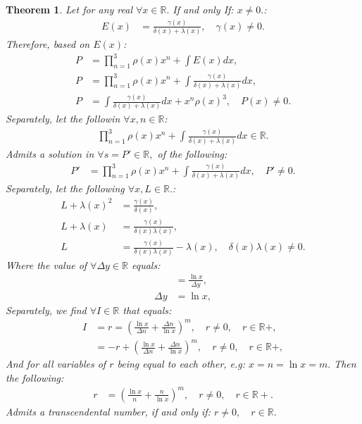 \documentclass[10pt]{article}
\theoremstyle{plain}
\newtheorem{theorem}{Theorem}[section]
\theoremstyle{definition}
\theoremstyle{remark}
\begin{document}
\begin{theorem}
	Let for any real $\forall x \in \mathbb{R}.$ If and only If: $x \neq 0.$:
	\begin{align*}
		E(x) &= \frac{\gamma(x)}{\delta(x) + \lambda(x)}, \quad \gamma(x) \neq 0.
	\end{align*}
	Therefore, based on $E(x)$:
	\begin{align*}
		P &= \prod_{n=1}^{3}\rho(x) x^{n} + \int E(x) dx,\\
		P &= \prod_{n=1}^{3}\rho(x) x^{n} + \int \frac{\gamma(x)}{\delta(x) + \lambda(x)} dx,\\
		P &= \int \frac{\gamma(x)}{\delta(x) + \lambda(x)} dx + x^{n} \rho(x)^{3}, \quad P(x) \neq 0.
	\end{align*}
	Separately, let the followin $\forall x, n \in \mathbb{R}$:
	\begin{align*}
		\prod_{n=1}^{3}\rho(x) x^{n} + \int \frac{\gamma(x)}{\delta(x) + \lambda(x)} dx \in \mathbb{R}.
	\end{align*}
	Admits a solution in $\forall s = P' \in \mathbb{R},$ of the following:
	\begin{align*}
		P' &= \prod_{n=1}^{3}\rho(x) x^{n} + \int \frac{\gamma(x)}{\delta(x) + \lambda(x)} dx, \quad P' \neq 0.
	\end{align*}
	Separately, let the following $\forall x, L \in \mathbb{R}.$:
	\begin{align*}
		L + \lambda(x)^{2} &= \frac{\gamma(x)}{\delta(x)},\\
	 	L + \lambda(x) &= \frac{\gamma(x)}{\delta(x)  \lambda(x) },\\
	 	L &= \frac{\gamma(x)}{\delta(x)  \lambda(x) } - \lambda(x), \quad \delta(x)\lambda(x) \neq 0.
	\end{align*}
	Where the value of $\forall \Delta y \in \mathbb{R}$ equals:
	\begin{align*}
		&= \frac{\ln x}{\Delta y},\\
		\Delta y &= \ln x,
	\end{align*}
	Separately, we find $\forall I \in \mathbb{R}$ that equals:
	\begin{align*}
		I &= r = ( \frac{\ln x}{\Delta n} + \frac{\Delta n}{\ln x})^m, \quad r \neq 0, \quad r \in \mathbb{R}{+},\\
		&= - r + ( \frac{\ln x}{\Delta n} + \frac{\Delta n}{\ln x})^m, \quad r \neq 0, \quad r \in \mathbb{R}{+},
	\end{align*}
	And for all variables of $r$ being equal to each other, e.g: $x =n = \ln x = m.$ Then the following:
	\begin{align*}
		r &= ( \frac{\ln x}{n} + \frac{n}{\ln x})^m, \quad r \neq 0, \quad r \in \mathbb{R}{+}.
	\end{align*}
	Admits a transcendental number, if and only if: $r \neq 0, \quad r \in \mathbb{R}$.
\end{theorem}
\end{document}
